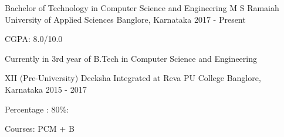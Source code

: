 \begin{cventries}
  \cventry
    {Bachelor of Technology in Computer Science and Engineering}
    {M S Ramaiah University of Applied Sciences}
    {Banglore, Karnataka}
    {2017 - Present}
    {
      \begin{cvitems}
        \item {CGPA: 8.0/10.0}
        \item {Currently in 3rd year of B.Tech in Computer Science and Engineering}
      \end{cvitems}
    }
     \cventry
    {XII (Pre-University) }
    {Deeksha Integrated at Reva PU College}
    {Banglore, Karnataka}
    {2015 - 2017}
    {
      \begin{cvitems}
        \item {Percentage : 80\%: }
        \item {Courses: PCM + B}
      \end{cvitems}
    }
    \vspace{-6mm}

\end{cventries}
